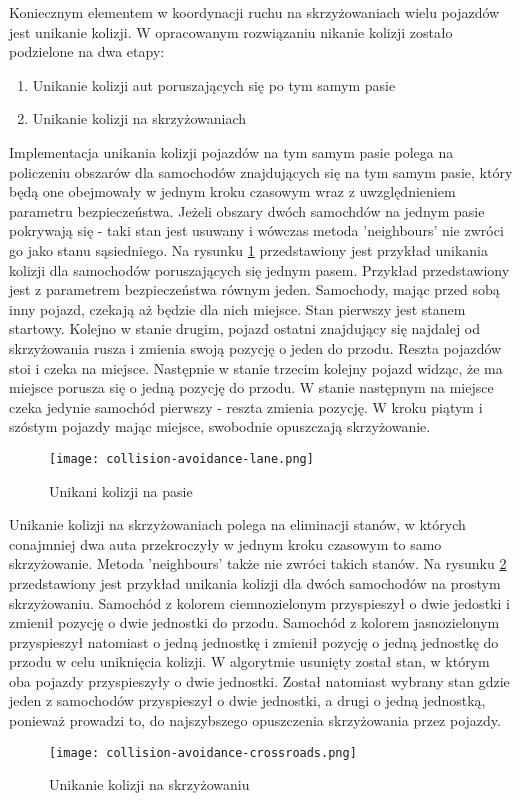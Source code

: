 Koniecznym elementem w koordynacji ruchu na skrzyżowaniach wielu pojazdów jest unikanie kolizji. W opracowanym rozwiązaniu nikanie kolizji zostało podzielone na dwa etapy:
\begin{enumerate}
\item Unikanie kolizji aut poruszających się po tym samym pasie
\item Unikanie kolizji na skrzyżowaniach
\end{enumerate}
Implementacja unikania kolizji pojazdów na tym samym pasie polega na policzeniu obszarów dla samochodów znajdujących się na tym samym pasie, który będą one obejmowały w jednym kroku czasowym wraz z uwzględnieniem parametru bezpieczeństwa. Jeżeli obszary dwóch samochdów na jednym pasie pokrywają się - taki stan jest usuwany i wówczas metoda 'neighbours' nie zwróci go jako stanu sąsiedniego. Na rysunku \ref{collision-avoidance-lane} przedstawiony jest przykład unikania kolizji dla samochodów poruszających się jednym pasem. Przykład przedstawiony jest z parametrem bezpieczeństwa równym jeden. Samochody, mając przed sobą inny pojazd, czekają aż będzie dla nich miejsce. Stan pierwszy jest stanem startowy. Kolejno w stanie drugim, pojazd ostatni znajdujący się najdalej od skrzyżowania rusza i zmienia swoją pozycję o jeden do przodu. Reszta pojazdów stoi i czeka na miejsce. Następnie w stanie trzecim kolejny pojazd widząc, że ma miejsce porusza się o jedną pozycję do przodu. W stanie następnym na miejsce czeka jedynie samochód pierwszy - reszta zmienia pozycję. W kroku piątym i szóstym pojazdy mając miejsce, swobodnie opuszczają skrzyżowanie.
\begin{figure}[H]
    \texttt{[image: collision-avoidance-lane.png]}
  \caption{Unikani kolizji na pasie}
  \label{collision-avoidance-lane}
\end{figure}
\newpage
Unikanie kolizji na skrzyżowaniach polega na eliminacji stanów, w których conajmniej dwa auta przekroczyły w jednym kroku czasowym to samo skrzyżowanie. Metoda 'neighbours' także nie zwróci takich stanów. Na rysunku \ref{collision-avoidance-crossroads} przedstawiony jest przykład unikania kolizji dla dwóch samochodów na prostym skrzyżowaniu. Samochód z kolorem ciemnozielonym przyspieszył o dwie jedostki i zmienił pozycję o dwie jednostki do przodu. Samochód z kolorem jasnozielonym przyspieszył natomiast o jedną jednostkę i zmienił pozycję o jedną jednostkę do przodu w celu uniknięcia kolizji. W algorytmie usunięty został stan, w którym oba pojazdy przyspieszyły o dwie jednostki. Został natomiast wybrany stan gdzie jeden z samochodów przyspieszył o dwie jednostki, a drugi o jedną jednostką, ponieważ prowadzi to, do najszybszego opuszczenia skrzyżowania przez pojazdy.
\begin{figure}[H]
    \texttt{[image: collision-avoidance-crossroads.png]}
  \caption{Unikanie kolizji na skrzyżowaniu}
  \label{collision-avoidance-crossroads}
\end{figure}
\newpage


